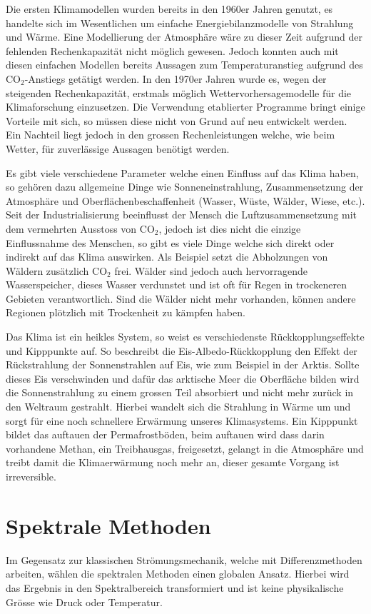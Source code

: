 \begin{refsection}
Die ersten Klimamodellen wurden bereits in den 1960er Jahren genutzt, es handelte sich im Wesentlichen um einfache Energiebilanzmodelle von Strahlung und Wärme. Eine Modellierung der Atmosphäre wäre zu dieser Zeit aufgrund der fehlenden Rechenkapazität nicht möglich gewesen. Jedoch konnten auch mit diesen einfachen Modellen bereits Aussagen zum Temperaturanstieg aufgrund des CO$_2$-Anstiegs getätigt werden. In den 1970er Jahren wurde es, wegen der steigenden Rechenkapazität, erstmals möglich Wettervorhersagemodelle für die Klimaforschung einzusetzen. Die Verwendung etablierter Programme bringt einige Vorteile mit sich, so müssen diese nicht von Grund auf neu entwickelt werden. Ein Nachteil liegt jedoch in den grossen Rechenleistungen welche, wie beim Wetter, für zuverlässige Aussagen benötigt werden.
 
Es gibt viele verschiedene Parameter welche einen Einfluss auf das Klima haben, so gehören dazu  allgemeine Dinge wie Sonneneinstrahlung, Zusammensetzung der Atmosphäre und Oberflächenbeschaffenheit (Wasser, Wüste, Wälder, Wiese, etc.). Seit der Industrialisierung beeinflusst der Mensch die Luftzusammensetzung mit dem vermehrten Ausstoss von CO$_2$, jedoch ist dies nicht die einzige Einflussnahme des Menschen, so gibt es viele Dinge welche sich direkt oder indirekt auf das Klima auswirken. Als Beispiel setzt die Abholzungen von Wäldern zusätzlich CO$_2$ frei. Wälder sind jedoch auch hervorragende Wasserspeicher, dieses Wasser verdunstet und ist oft für Regen in trockeneren Gebieten verantwortlich. Sind die Wälder nicht mehr vorhanden, können andere Regionen plötzlich mit Trockenheit zu kämpfen haben.

Das Klima ist ein heikles System, so weist es verschiedenste Rückkopplungseffekte und Kipppunkte auf. So beschreibt die Eis-Albedo-Rückkopplung den Effekt der Rückstrahlung der Sonnenstrahlen auf Eis, wie zum Beispiel in der Arktis. Sollte dieses Eis verschwinden und dafür das arktische Meer die Oberfläche bilden wird die Sonnenstrahlung zu einem grossen Teil absorbiert und nicht mehr zurück in den Weltraum gestrahlt. Hierbei wandelt sich die Strahlung in Wärme um und sorgt für eine noch schnellere Erwärmung unseres Klimasystems. Ein Kipppunkt bildet das auftauen der Permafrostböden, beim auftauen wird dass darin vorhandene Methan, ein Treibhausgas, freigesetzt, gelangt in die Atmosphäre und treibt damit die Klimaerwärmung noch mehr an, dieser gesamte Vorgang ist irreversible.

\section{Spektrale Methoden
\label{klima:section:spektrale}}
Im Gegensatz zur klassischen Strömungsmechanik, welche mit Differenzmethoden arbeiten, wählen die spektralen Methoden einen globalen Ansatz. Hierbei wird das Ergebnis in den Spektralbereich transformiert und ist keine physikalische Grösse wie Druck oder Temperatur.


\end{refsection}
